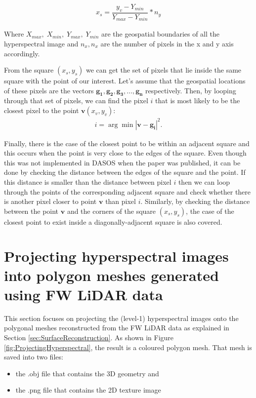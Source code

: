 \documentclass{subfiles}
\begin{document}
	 \begin{eqnarray}
	 x_s = \dfrac{y_v-Y_{min}}{Y_{max}-Y_{min}} * n_y 
	 \end{eqnarray}
 
	\par Where $X_{max},\; X_{min},\; Y_{max},\; Y_{min} $ are the geospatial boundaries of all the hyperspectral image and $n_x, n_x$ are the number of pixels in the x and y axis accordingly. 
	
	\par From the square $(x_s,y_s)$ we can get the set of pixels that lie inside the same square with the point of our interest. Let’s assume that the geospatial locations of these pixels are the vectors $\mathbf{g_1},\mathbf{g_2}, \mathbf{g_3}, ... , \mathbf{g_n}$ respectively. Then, by looping through that set of pixels, we can find the pixel $i$ that is most likely to be the closest pixel to the point $\mathbf{v}(x_v , y_v)$:
	\begin{eqnarray}
		i = \arg\min{|\mathbf{v}-\mathbf{g_i}|^2} .
	\end{eqnarray}
	
	\par Finally, there is the case of the closest point to be within an adjacent square and this occurs when the point is very close to the edges of the square. Even though this was not implemented in DASOS when the paper \cite{Miltiadou2015} was published, it can be done by checking the distance between the edges of the square and the point. If this distance is smaller than the distance between pixel $i$ then we can loop through the points of the corresponding adjacent square and check whether there is another pixel closer to point $\mathbf{v}$ than pixel $i$. Similarly, by checking the distance between the point $\mathbf{v}$ and the corners of the square $(x_s,y_s)$, the case of the closest point to exist inside a diagonally-adjacent square is also covered. 
	
		
\section{Projecting hyperspectral images into polygon meshes generated using FW LiDAR data}\label{sec:ProjectingHyperspectral}
	\par This section focuses on projecting the (level-1) hyperspectral images onto the polygonal meshes reconstructed from the FW LiDAR data as explained in Section \ref{sec:SurfaceReconstruction}. As shown in Figure \ref{fig:ProjectingHyperspectral}, the result is a coloured polygon mesh. That mesh is saved into two files: 
	 \begin{itemize}
	 	\item the .obj file that contains the 3D geometry and
	 	\item the .png file that contains the 2D texture image
	 \end{itemize} 	
\end{document}
